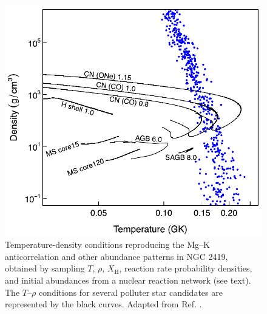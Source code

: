 \begin{figure}[t]
\centering
\includegraphics[width=4.5in]{Chapter-6/figs/Trho_Iliadis2016.png}
\caption{\label{fig:Trho_Iliadis}Temperature-density conditions reproducing the Mg--K anticorrelation and other abundance patterns in NGC 2419, obtained by sampling $T$, $\rho$, $X_{\mathrm{H}}$, reaction rate probability densities, and initial abundances from a nuclear reaction network (see text). The $T$--$\rho$ conditions for several polluter star candidates are represented by the black curves. Adapted from Ref. \cite{Iliadis2016}.}
\end{figure}


